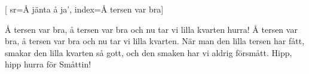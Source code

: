 [
		sr={Å jänta å ja'},
		index={Å tersen var bra}]

\beginverse*						
Å tersen var bra, å tersen var bra
och nu tar vi lilla kvarten hurra!
Å tersen var bra, å tersen var bra
och nu tar vi lilla kvarten.
När man den lilla tersen har fått,
smakar den lilla kvarten så gott,
och den smaken har vi aldrig försmått.
Hipp, hipp hurra för Småttin!
\endverse		
\endsong